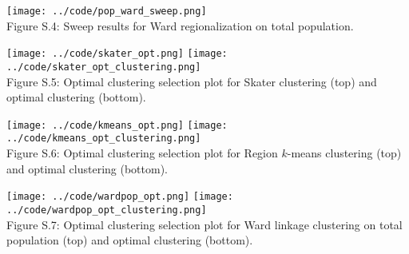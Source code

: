 \documentclass{article}
\begin{document}
    \begin{center}
        \texttt{[image: ../code/pop\_ward\_sweep.png]} \\
        Figure S.4: Sweep results for Ward regionalization on total population.
    \end{center}

    \begin{center}
        \texttt{[image: ../code/skater\_opt.png]} \texttt{[image: ../code/skater\_opt\_clustering.png]} \\
        Figure S.5: Optimal clustering selection plot for Skater clustering (top) and optimal clustering (bottom).
    \end{center}

    \begin{center}
        \texttt{[image: ../code/kmeans\_opt.png]} \texttt{[image: ../code/kmeans\_opt\_clustering.png]} \\
        Figure S.6: Optimal clustering selection plot for Region $k$-means clustering (top) and optimal clustering (bottom).
    \end{center}

    \begin{center}
        \texttt{[image: ../code/wardpop\_opt.png]} \texttt{[image: ../code/wardpop\_opt\_clustering.png]} \\
        Figure S.7: Optimal clustering selection plot for Ward linkage clustering on total population (top) and optimal clustering (bottom).
    \end{center}
\end{document}
